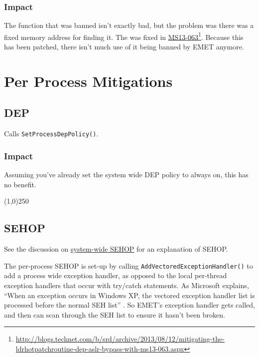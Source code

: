 \documentclass[]{article}
\newcommand{\fhref}[2]{\href{#1}{#2}\footnote{\url{#1}}}
\newcommand{\sectionbreakline}[0]{\begin{center}\line(1,0){250}\end{center}}
\begin{document}
\subsubsection{Impact}
The function that was banned isn't exactly bad, but the problem was there was a fixed memory address for finding it.  The was fixed in \fhref{http://blogs.technet.com/b/srd/archive/2013/08/12/mitigating-the-ldrhotpatchroutine-dep-aslr-bypass-with-ms13-063.aspx}{MS13-063}\cite{ms13_063}. Because this has been patched, there isn't much use of it being banned by EMET anymore.









\section{Per Process Mitigations}\label{per-process-mitigations}

\subsection{DEP}\label{dep}
Calls \texttt{SetProcessDepPolicy()}.

\subsubsection{Impact}

Assuming you've already set the system wide DEP policy to always on, this has no benefit.

\sectionbreakline{}












\subsection{SEHOP}\label{sehop}
See the discussion on \hyperref[system_sehop]{system-wide SEHOP} for an explanation of SEHOP.

The per-process SEHOP is set-up by calling \texttt{AddVectoredExceptionHandler()} to add a process wide exception handler, as opposed to the local per-thread exception handlers that occur with try/catch statements.  As Microsoft explains, ``When an exception occurs in Windows XP, the vectored exception handler list is processed before the normal SEH list''  \cite{seh_explanation}.  So EMET's exception handler gets called, and then can scan through the SEH list to ensure it hasn't been broken.
\end{document}

